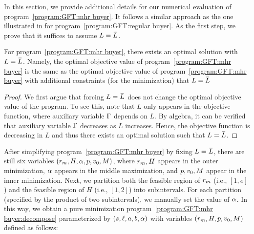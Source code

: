 
In this section, we provide additional details for our numerical evaluation of program~\ref{program:GFT:mhr buyer}. It follows a similar approach as the one illustrated in  for program~\ref{program:GFT:regular buyer}.
As the first step, we prove that it suffices to assume $L = \LOverBar$.
\begin{lemma}
\label{lem:mhr buyer program:reducing variables}
    For program~\ref{program:GFT:mhr buyer}, there exists an optimal solution with $L = \LOverBar$. Namely, the optimal objective value of program~\ref{program:GFT:mhr buyer} is the same as the optimal objective value of program~\ref{program:GFT:mhr buyer} with additional constraints (for the minimization) that $L = \LOverBar$
\end{lemma}
\begin{proof}
    We first argue that forcing $L = \LOverBar$ does not change the optimal objective value of the program. To see this, note that $L$ only appears in the objective function, where auxiliary variable $\Gamma$ depends on $L$. By algebra, it can be verified that auxiliary variable $\Gamma$ decreases as $L$ increases. Hence, the objective function is decreasing in $L$ and thus there exists an optimal solution such that $L = \LOverBar$.
\end{proof}
After simplifying program~\ref{program:GFT:mhr buyer} by fixing $L = \LOverBar$, there are still six variables $(r_m, H, \alpha,p,v_0, M)$, where $r_m, H$ appears in the outer minimization, $\alpha$ appears in the middle maximization, and $p,v_0, M$ appear in the inner minimization. Next, we partition both the feasible region of $r_m$ (i.e., $[1, e]$) and the feasible region of $H$ (i.e., $[1, 2]$) into subintervals. For each partition (specified by the product of two subintervals), we manually set the value of $\alpha$. In this way, we obtain a pure minimization program~\ref{program:GFT:mhr buyer:decompose} parameterized by $(s,\ell, a, b, \alpha)$ with variables $(r_m,H, p,v_0, M)$ defined as follows:
